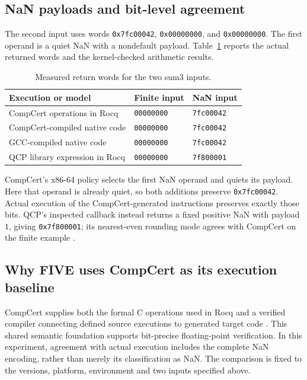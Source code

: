 \documentclass[manuscript, screen, review]{acmart}
\begin{document}
\subsection{NaN payloads and bit-level agreement}

The second input uses words \texttt{0x7fc00042}, \texttt{0x00000000},
and \texttt{0x00000000}. The first operand is a quiet NaN with a
nondefault payload. Table~\ref{tab:sum3-measured} reports the actual
returned words and the kernel-checked arithmetic results.

\begin{table}[h]
\centering
\caption{Measured return words for the two sum3 inputs.}
\label{tab:sum3-measured}
\begin{tabular}{lll}
\hline
Execution or model & Finite input & NaN input \\
\hline
CompCert operations in Rocq & \texttt{00000000} & \texttt{7fc00042} \\
CompCert-compiled native code & \texttt{00000000} & \texttt{7fc00042} \\
GCC-compiled native code & \texttt{00000000} & \texttt{7fc00042} \\
QCP library expression in Rocq & \texttt{00000000} & \texttt{7f800001} \\
\hline
\end{tabular}
\end{table}

CompCert's x86-64 policy selects the first NaN operand and quiets its
payload. Here that operand is already quiet, so both additions preserve
\texttt{0x7fc00042}. Actual execution of the CompCert-generated instructions
preserves exactly those bits. QCP's inspected callback instead returns a
fixed positive NaN with payload $1$, giving \texttt{0x7f800001}; its
nearest-even rounding mode agrees with CompCert on the finite example
\cite{QCPFloatLib214,CompCertFloats317,CompCertArchi317}.

\subsection{Why FIVE uses CompCert as its execution baseline}

CompCert supplies both the formal C operations used in Rocq and a verified
compiler connecting defined source executions to generated target code
\cite{Leroy2009}. This shared semantic foundation supports bit-precise
floating-point verification. In this experiment, agreement with actual
execution includes the complete NaN encoding, rather than merely its
classification as NaN. The comparison is fixed to the versions, platform,
environment and two inputs specified above.
\end{document}

